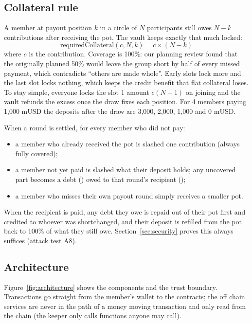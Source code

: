 \subsection{Collateral rule}
\label{sec:collateral}
A member at payout position $k$ in a circle of $N$ participants still owes $N-k$ contributions after
receiving the pot. The vault keeps exactly that much locked:
\begin{equation}
  \text{requiredCollateral}(c, N, k) = c \times (N - k)
\end{equation}
where $c$ is the contribution. Coverage is 100\%: our planning review found that the originally
planned 50\% would leave the group short by half of every missed payment, which contradicts
\enquote{others are made whole}. Early slots lock more and the last slot locks nothing, which keeps
the credit benefit that flat collateral loses. To stay simple, everyone locks the slot 1 amount
$c(N-1)$ on joining and the vault refunds the excess once the draw fixes each position. For 4
members paying 1,000 mUSD the deposits after the draw are 3,000, 2,000, 1,000 and 0 mUSD.

When a round is settled, for every member who did not pay:
\begin{itemize}
  \item a member who already received the pot is slashed one contribution (always fully covered);
  \item a member not yet paid is slashed what their deposit holds; any uncovered part becomes a debt
        () owed to that round's recipient ();
  \item a member who misses their own payout round simply receives a smaller pot.
\end{itemize}
When the recipient is paid, any debt they owe is repaid out of their pot first and credited to whoever
was shortchanged, and their deposit is refilled from the pot back to 100\% of what they still owe.
Section~\ref{sec:security} proves this always suffices (attack test A8).

\subsection{Architecture}
Figure~\ref{fig:architecture} shows the components and the trust boundary. Transactions go straight
from the member's wallet to the contracts; the off chain services are never in the path of a money
moving transaction and only read from the chain (the keeper only calls functions anyone may call).

